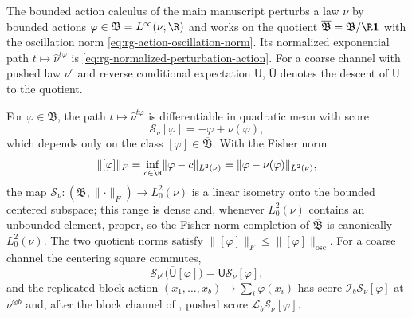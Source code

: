 The bounded action calculus of the main manuscript perturbs a law \(\nu\) by bounded
actions \(\varphi\in\mathfrak B=L^\infty(\nu;\R)\) and works on the quotient
\(\overline{\mathfrak B}=\mathfrak B/\R\mathbf 1\) with the oscillation norm
\eqref{eq:rg-action-oscillation-norm}. Its normalized exponential path
\(t\mapsto\widehat\nu^{t\varphi}\) is \eqref{eq:rg-normalized-perturbation-action}. For a
coarse channel with pushed law \(\nu^c\) and reverse conditional expectation \(\mathsf U\),
\(\overline{\mathsf U}\) denotes the descent of \(\mathsf U\) to the quotient.

For \(\varphi\in\mathfrak B\), the path \(t\mapsto\widehat\nu^{t\varphi}\) is
differentiable in quadratic mean with score
\begin{equation}
\mathscr S_\nu[\varphi]=-\varphi+\nu(\varphi),
\label{eq:rg-action-score-map}
\end{equation}
which depends only on the class \([\varphi]\in\overline{\mathfrak B}\). With the Fisher
norm
\begin{equation}
\lVert[\varphi]\rVert_F
=\inf_{c\in\R}\lVert\varphi-c\rVert_{L^2(\nu)}
=\lVert\varphi-\nu(\varphi)\rVert_{L^2(\nu)},
\label{eq:rg-action-fisher-norm}
\end{equation}
the map \(\mathscr S_\nu:(\overline{\mathfrak B},\lVert\cdot\rVert_F)\to L^2_0(\nu)\) is a
linear isometry onto the bounded centered subspace; this range is dense and, whenever
\(L^2_0(\nu)\) contains an unbounded element, proper, so the Fisher-norm completion of
\(\overline{\mathfrak B}\) is canonically \(L^2_0(\nu)\). The two quotient norms satisfy
\(\lVert[\varphi]\rVert_F\leq\lVert[\varphi]\rVert_{\mathrm{osc}}\). For a coarse channel
the centering square commutes,
\begin{equation}
\mathscr S_{\nu^c}\bigl(\overline{\mathsf U}[\varphi]\bigr)
=\mathsf U\mathscr S_\nu[\varphi],
\label{eq:rg-score-action-square}
\end{equation}
and the replicated block action \((x_1,\dots,x_b)\mapsto\sum_i\varphi(x_i)\) has score
\(\mathscr I_b\mathscr S_\nu[\varphi]\) at \(\nu^{\otimes b}\) and, after the block
channel of , pushed score
\(\mathscr L_b\mathscr S_\nu[\varphi]\). 

